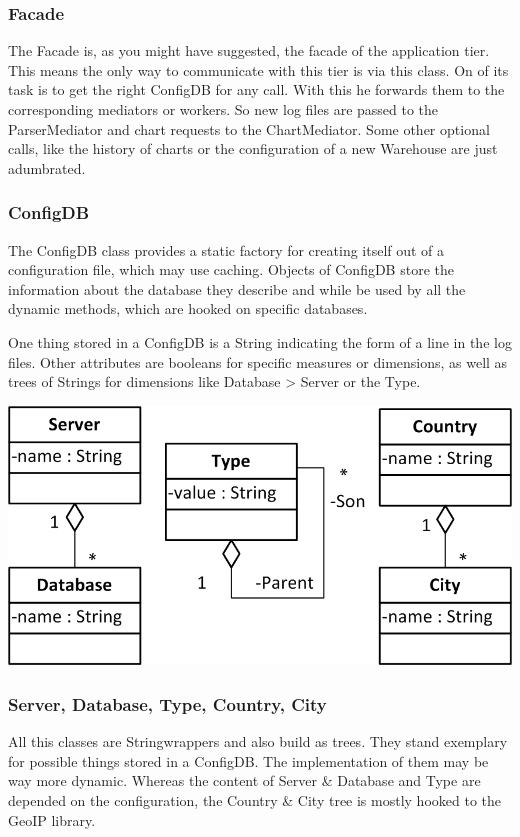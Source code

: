 \subsubsection*{Facade}
The Facade is, as you might have suggested, the facade of the application tier. 
This means the only way to communicate with this tier is via this class.
On of its task is to get the right ConfigDB for any call. With this he forwards
them to the corresponding mediators or workers. So new log files are passed to
the ParserMediator and chart requests to the ChartMediator. Some other optional
calls, like the history of charts or the configuration of a new Warehouse are just
adumbrated.


\subsubsection*{ConfigDB}
The ConfigDB class provides a static factory for creating itself out of a configuration
file, which may use caching. Objects of ConfigDB store the information about the database
they describe and while be used by all the dynamic methods, which are hooked on specific
databases. 

One thing stored in a ConfigDB is a String indicating the form of a line in the log files.
Other attributes are booleans for specific measures or dimensions, as well as trees of
Strings for dimensions like Database > Server or the Type.

\newpage
\begin{center}
\includegraphics{Pictures/Parts/Strings.png}
\end{center}  
\subsubsection*{Server, Database, Type, Country, City}
All this classes are Stringwrappers and also build as trees. They stand exemplary for
possible things stored in a ConfigDB. The implementation of them may be way more dynamic.
Whereas the content of Server \& Database and Type are depended on the configuration,
the Country \& City tree is mostly hooked to the GeoIP library.


